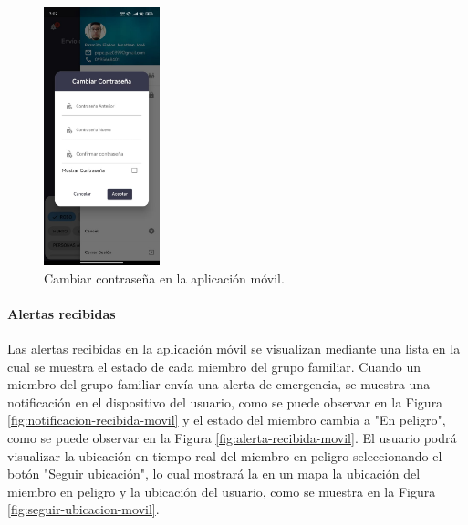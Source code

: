 \begin{figure}[H]
    \centering
    \includegraphics[width=0.3\textwidth]{chapters/III-resultados-y-discusion/resources/images/cambiar-contrasena-movil.png}
    \caption{Cambiar contraseña en la aplicación móvil.}
    \label{fig:cambiar-contrasena-movil}
\end{figure}

\paragraph{Alertas recibidas}
Las alertas recibidas en la aplicación móvil se visualizan mediante una lista en la cual se muestra el estado de cada miembro del
grupo familiar. Cuando un miembro del grupo familiar envía una alerta de emergencia, se muestra una notificación en el dispositivo
del usuario, como se puede observar en la Figura \ref{fig:notificacion-recibida-movil} y el estado del miembro cambia a "En peligro", como se
puede observar en la Figura \ref{fig:alerta-recibida-movil}. El usuario podrá visualizar la ubicación en tiempo real del miembro en
peligro seleccionando el botón "Seguir ubicación", lo cual mostrará la en un mapa la ubicación del miembro en peligro y la ubicación
del usuario, como se muestra en la Figura \ref{fig:seguir-ubicacion-movil}.

